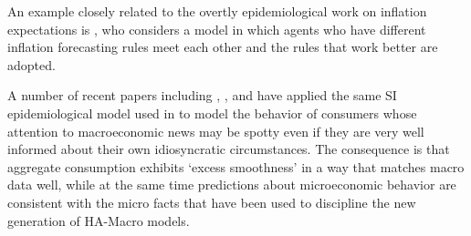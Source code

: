 An example closely related to the overtly epidemiological work on inflation expectations is \cite{branchHeteroExp}, who considers a model in which agents who have different inflation forecasting rules meet each other and the rules that work better are adopted.

A number of recent papers including \cite{shibata2019current}, \cite{carroll2020sticky}, and \cite{auclert2020micro} have applied the same SI epidemiological model used in \cite{carroll2003macroeconomic} to model the behavior of consumers whose attention to macroeconomic news may be spotty even if they are very well informed about their own idiosyncratic circumstances.  The consequence is that aggregate consumption exhibits `excess smoothness' in a way that matches macro data well, while at the same time predictions about microeconomic behavior are consistent with the micro facts that have been used to discipline the new generation of HA-Macro models.


